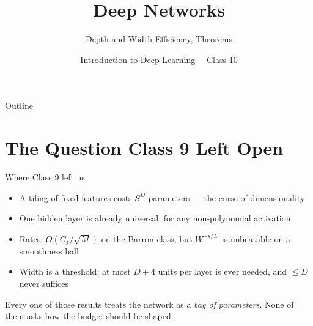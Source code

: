 \documentclass[aspectratio=169, 11pt]{beamer}
\title{Deep Networks}
\subtitle{Depth and Width Efficiency, Theorems}
\author{Introduction to Deep Learning \ \textperiodcentered\ Class 10}
\institute{}
\date{}
\newcommand{\nosrc}{}       %
\begin{document}
\maketitle

\begin{frame}{Outline}
  \nosrc
  \tableofcontents
\end{frame}

\section{The Question Class 9 Left Open}

\begin{frame}{Where Class 9 left us}
  \nosrc
  \vspace{0.2em}
  \begin{itemize}\setlength{\itemsep}{4pt}
    \item A tiling of fixed features costs $S^{D}$ parameters --- the
          \alert{curse of dimensionality}
    \item One hidden layer is already \alert{universal}, for any
          non-polynomial activation
    \item Rates: $O(C_f/\sqrt{M})$ on the Barron class, but
          $W^{-s/D}$ is unbeatable on a smoothness ball
    \item \alert{Width is a threshold}: at most $D+4$ units per layer
          is ever needed, and $\leq D$ never suffices
  \end{itemize}
  \vspace{0.4em}
  \begin{redhighlight}
    Every one of those results treats the network as a \emph{bag of
    parameters}. None of them asks how the budget should be
    \alert{shaped}.
  \end{redhighlight}
\end{frame}
\end{document}
